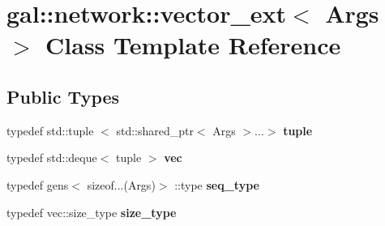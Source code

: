 \hypertarget{classgal_1_1network_1_1vector__ext}{\section{gal\-:\-:network\-:\-:vector\-\_\-ext$<$ \-Args $>$ \-Class \-Template \-Reference}
\label{classgal_1_1network_1_1vector__ext}
}
\subsection*{\-Public \-Types}
\begin{DoxyCompactItemize}
\item 
\hypertarget{classgal_1_1network_1_1vector__ext_a43f948bb7b6e59852f6412a54c161287}{typedef std\-::tuple\*
$<$ std\-::shared\-\_\-ptr$<$ \-Args $>$...$>$ {\bfseries tuple}}\label{classgal_1_1network_1_1vector__ext_a43f948bb7b6e59852f6412a54c161287}

\item 
\hypertarget{classgal_1_1network_1_1vector__ext_a1954fce41858f6273a6718940547a337}{typedef std\-::deque$<$ tuple $>$ {\bfseries vec}}\label{classgal_1_1network_1_1vector__ext_a1954fce41858f6273a6718940547a337}

\item 
\hypertarget{classgal_1_1network_1_1vector__ext_a69bfb7e937959532d332fc8e88e03573}{typedef gens$<$ sizeof...(\-Args)$>$\*
\-::type {\bfseries seq\-\_\-type}}\label{classgal_1_1network_1_1vector__ext_a69bfb7e937959532d332fc8e88e03573}

\item 
\hypertarget{classgal_1_1network_1_1vector__ext_ac7c4f1bf0d33c52667c1cf6afefa9f3c}{typedef vec\-::size\-\_\-type {\bfseries size\-\_\-type}}\label{classgal_1_1network_1_1vector__ext_ac7c4f1bf0d33c52667c1cf6afefa9f3c}

\end{DoxyCompactItemize}
